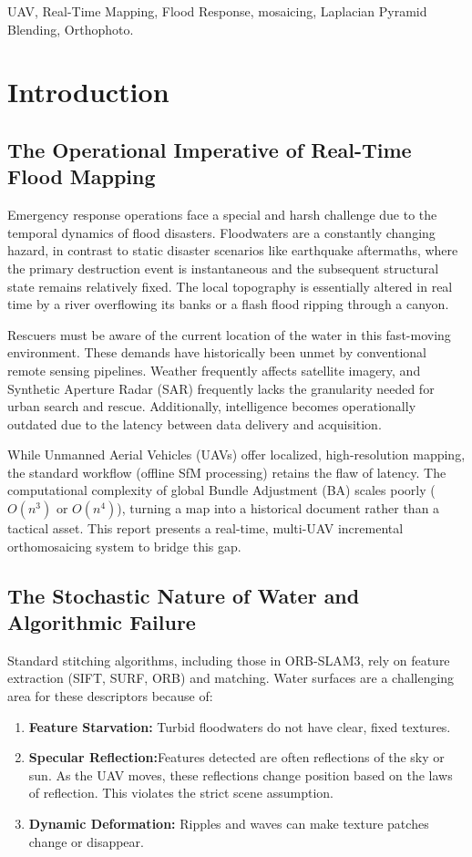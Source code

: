 \documentclass[conference]{IEEEtran}
\begin{document}
\begin{IEEEkeywords}
UAV, Real-Time Mapping, Flood Response, mosaicing, Laplacian Pyramid Blending, Orthophoto.   
\end{IEEEkeywords}

\section{Introduction}

\subsection{The Operational Imperative of Real-Time Flood Mapping}
Emergency response operations face a special and harsh challenge due to the temporal dynamics of flood disasters. Floodwaters are a constantly changing hazard, in contrast to static disaster scenarios like earthquake aftermaths, where the primary destruction event is instantaneous and the subsequent structural state remains relatively fixed. The local topography is essentially altered in real time by a river overflowing its banks or a flash flood ripping through a canyon.

Rescuers must be aware of the current location of the water in this fast-moving environment. These demands have historically been unmet by conventional remote sensing pipelines. Weather frequently affects satellite imagery, and Synthetic Aperture Radar (SAR) frequently lacks the granularity needed for urban search and rescue. Additionally, intelligence becomes operationally outdated due to the latency between data delivery and acquisition.

While Unmanned Aerial Vehicles (UAVs) offer localized, high-resolution mapping, the standard workflow (offline SfM processing) retains the flaw of latency. The computational complexity of global Bundle Adjustment (BA) scales poorly ($O(n^3)$ or $O(n^4)$), turning a map into a historical document rather than a tactical asset. This report presents a real-time, multi-UAV incremental orthomosaicing system to bridge this gap.

\subsection{The Stochastic Nature of Water and Algorithmic Failure}
Standard stitching algorithms, including those in ORB-SLAM3, rely on feature extraction (SIFT, SURF, ORB) and matching. Water surfaces are a challenging area for these descriptors because of:
\begin{enumerate}
    \item \textbf{Feature Starvation:} Turbid floodwaters do not have clear, fixed textures.
    \item \textbf{Specular Reflection:}Features detected are often reflections of the sky or sun. As the UAV moves, these reflections change position based on the laws of reflection. This violates the strict scene assumption.
    \item \textbf{Dynamic Deformation:} Ripples and waves can make texture patches change or disappear.
\end{enumerate}
\end{document}
